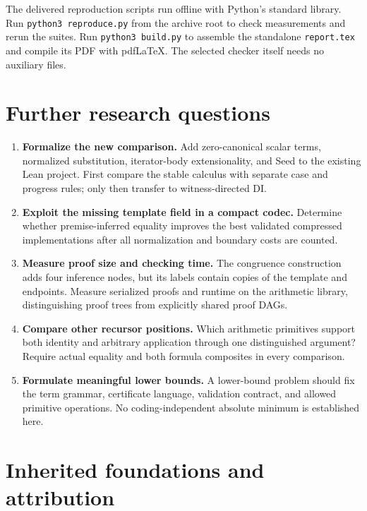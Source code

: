 \documentclass[11pt,a4paper]{article}
\theoremstyle{definition}
\begin{document}
The delivered reproduction scripts run offline with Python's standard
library. Run \texttt{python3 reproduce.py} from the archive root to
check measurements and rerun the suites. Run \texttt{python3 build.py}
to assemble the standalone \texttt{report.tex} and compile its PDF
with pdfLaTeX. The selected checker itself needs no auxiliary files.

\section{Further research questions}

\begin{enumerate}
\item \textbf{Formalize the new comparison.}
Add zero-canonical scalar terms, normalized substitution, iterator-body
extensionality, and Seed to the existing Lean project. First compare
the stable calculus with separate case and progress rules; only then
transfer to witness-directed DI.
\item \textbf{Exploit the missing template field in a compact codec.}
Determine whether premise-inferred equality improves the best
validated compressed implementations after all normalization and
boundary costs are counted.
\item \textbf{Measure proof size and checking time.}
The congruence construction adds four inference nodes, but its labels
contain copies of the template and endpoints. Measure serialized proofs
and runtime on the arithmetic library, distinguishing proof trees
from explicitly shared proof DAGs.
\item \textbf{Compare other recursor positions.}
Which arithmetic primitives support both identity and arbitrary
application through one distinguished argument? Require actual
equality and both formula composites in every comparison.
\item \textbf{Formulate meaningful lower bounds.}
A lower-bound problem should fix the term grammar, certificate
language, validation contract, and allowed primitive operations.
No coding-independent absolute minimum is established here.
\end{enumerate}

\appendix
\clearpage
\section*{Inherited foundations and attribution}
\end{document}
